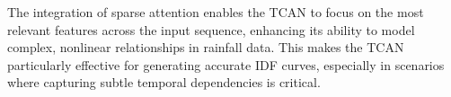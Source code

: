 \vspace{1em}

The integration of sparse attention enables the TCAN to focus on the most relevant features across the input sequence, enhancing its ability to model complex, nonlinear relationships in rainfall data. This makes the TCAN particularly effective for generating accurate IDF curves, especially in scenarios where capturing subtle temporal dependencies is critical.
